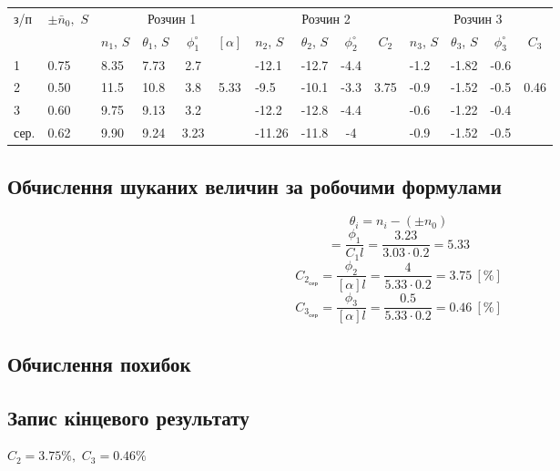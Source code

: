 \documentclass[12pt]{article}
\begin{document}
{\renewcommand{\arraystretch}{1.3}
\begin{center}
	\begin{tabular}{|p{20pt}|p{25pt}|p{25pt}|p{25pt}|c|c|p{40pt}|p{30pt}|c|c|p{30pt}|p{30pt}|c|c|}
	\hline
		\No{} з/п & $\pm\bar n_0,$ \textdegree$S$ & \multicolumn{4}{c|}{Розчин 1}
		& \multicolumn{4}{c|}{Розчин 2} & \multicolumn{4}{c|}{Розчин 3} \\
	\cline{3-14}
		& & $n_1$, \textdegree$S$ & $\theta_1$, \textdegree$S$ & $\phi_1^\circ$ & $[\alpha]$ &
		$n_2$, \textdegree$S$ & $\theta_2$, \textdegree$S$ & $\phi_2^\circ$ & $C_2$ &
		$n_3$, \textdegree$S$ & $\theta_3$, \textdegree$S$ & $\phi_3^\circ$ & $C_3$ \\
		\hline
		1 & 0.75 & 8.35 & 7.73 & 2.7 & & -12.1 & -12.7 & -4.4 & & -1.2 & -1.82 & -0.6 & \\
		\cline{1-5} \cline{7-9} \cline{11-13}
		2 & 0.50 & 11.5 & 10.8 & 3.8 & 5.33 & -9.5 & -10.1 & -3.3 & 3.75 & -0.9 & -1.52 & -0.5 & 0.46 \\
		\cline{1-5} \cline{7-9} \cline{11-13}
		3 & 0.60 & 9.75 & 9.13 & 3.2 & & -12.2 & -12.8 & -4.4 & & -0.6 & -1.22 & -0.4 & \\
		\cline{1-5} \cline{7-9} \cline{11-13}
		сер. & 0.62 & 9.90 & 9.24 & 3.23 & & -11.26 & -11.8 & -4 & & -0.9 & -1.52 & -0.5 & \\
		\hline
\end{tabular}

\end{center}
}

\begin{center}

\subsection*{Обчислення шуканих величин за робочими формулами}
	\begin{equation}
		\theta_i=n_i-(\pm n_0)
	\end{equation}
	\begin{equation}
		[\alpha]=\frac{\phi_1}{C_1l}=\frac{3.23}{3.03\cdot0.2}=5.33
	\end{equation}
	\begin{equation}
		C_{2_\text{сер}}=\frac{\phi_2}{[\alpha]l}=\frac{4}{5.33\cdot0.2}=3.75~[\%]
	\end{equation}
	\begin{equation}
		C_{3_\text{сер}}=\frac{\phi_3}{[\alpha]l}=\frac{0.5}{5.33\cdot0.2}=0.46~[\%]
	\end{equation}

\subsection*{Обчислення похибок}

\subsection*{Запис кінцевого результату}
		$C_2=3.75\%,$
		$C_3=0.46\%$

\end{center}
\end{document}
